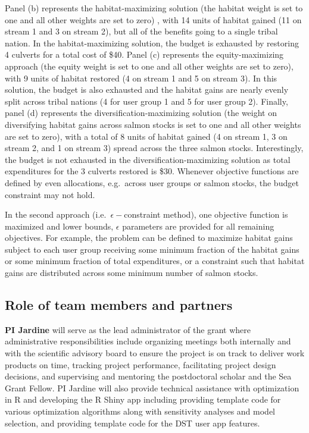 \documentclass[12pt]{elsarticle}
\begin{document}
Panel (b) represents the habitat-maximizing solution (the habitat weight is set to one and all other weights are set to zero) , with 14 units of habitat gained (11 on stream 1 and 3 on stream 2), but all of the benefits going to a single tribal nation. In the habitat-maximizing solution, the budget is exhausted by restoring 4 culverts for a total cost of \$40. Panel (c) represents the equity-maximizing approach (the equity weight is set to one and all other weights are set to zero), with 9 units of habitat restored (4 on stream 1 and 5 on stream 3). In this solution, the budget is also exhausted and the habitat gains are nearly evenly split across tribal nations (4 for user group 1 and 5 for user group 2). Finally, panel (d) represents the diversification-maximizing solution (the weight on diversifying habitat gains across salmon stocks is set to one and all other weights are set to zero), with a total of 8 units of habitat gained (4 on stream 1, 3 on stream 2, and 1 on stream 3) spread across the three salmon stocks. Interestingly, the budget is not exhausted in the diversification-maximizing solution as total expenditures for the 3 culverts restored is \$30. Whenever objective functions are defined by even allocations, e.g.\ across user groups or salmon stocks, the budget constraint may not hold.

In the second approach (i.e.\ $\epsilon-$constraint method), one objective function is maximized and lower bounds, $\epsilon$ parameters are provided for all remaining objectives. For example, the problem can be defined to maximize habitat gains subject to each user group receiving some minimum fraction of the habitat gains or some minimum fraction of total expenditures, or a constraint such that habitat gains are distributed across some minimum number of salmon stocks.


\subsection{Role of team members and partners}
\textbf{PI Jardine} will serve as the lead administrator of the grant where administrative responsibilities include organizing meetings both internally and with the scientific advisory board to ensure the project is on track to deliver work products on time, tracking project performance, facilitating project design decisions, and supervising and mentoring the postdoctoral scholar and the Sea Grant Fellow.  PI Jardine will also provide technical assistance with optimization in R and developing the R Shiny app including providing template code for various optimization algorithms along with sensitivity analyses and model selection, and providing template code for the DST user app features.\\
\end{document}
